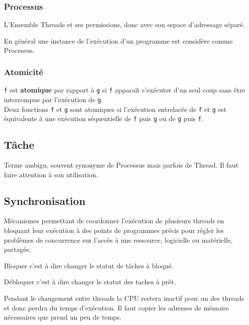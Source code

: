 \documentclass{article}
\begin{document}
\subsubsection{Processus}
\begin{definition}
    L'Ensemble Threads et ses permissions, donc avec son espace d'adressage séparé.

    \begin{remark}
        En général une instance de l'exécution d'un programme est considère comme Processus.
    \end{remark}
\end{definition}

\subsubsection{Atomicité}
\begin{definition}
    \texttt{f} est \textbf{atomique} par rapport à \texttt{g} si \texttt{f} apparaît s'exécuter d'un seul coup sans être interrompue par l'exécution de \texttt{g}.\\

    Deux fonctions \texttt{f} et \texttt{g} sont atomiques si l'exécution entrelacée de \texttt{f} et \texttt{g} est équivalente à une exécution séquentielle de \texttt{f} puis \texttt{g} ou de \texttt{g} puis \texttt{f}.
\end{definition}

\subsection{Tâche}
\begin{definition}
    Terme ambigu, souvent synonyme de Processus mais parfois de Thread. Il faut faire attention à son utilisation.
\end{definition}


\subsection{Synchronisation}
\begin{definition}
    Mécanismes permettant de coordonner l'exécution de plusieurs threads en bloquant leur exécution à des points de programmes précis pour régler les problèmes de concurrence sur l'accès à une ressource, logicielle ou matérielle, partagée.

    \begin{remark}
        Bloquer c'est à dire changer le statut de tâches à bloqué.
    \end{remark}
    \begin{remark}
        Débloquer c'est à dire changer le statut des taches à prêt.
    \end{remark}

    Pendant le changement entre threads la CPU restera inactif pour un des threads et donc perdra du temps d'exécution. Il faut copier les adresses de mémoire nécessaires que prend un peu de temps.
\end{definition}
\end{document}

